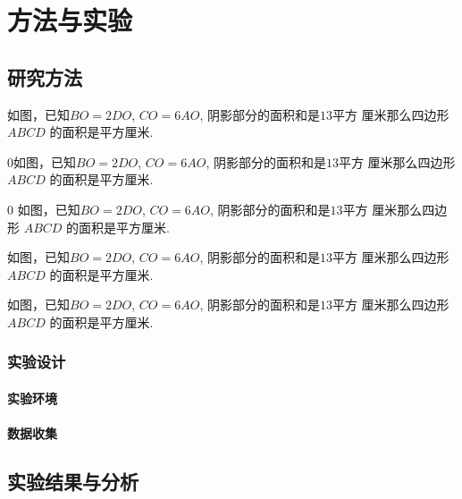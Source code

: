 \documentclass{USTBBook}
\begin{document}
\part{方法与实验}
\ToggleSectionStyle
\ToggleQuestionStyle

\chapter{研究方法}

\begin{question}
  如图，已知$BO=2DO$, $CO=6AO$, 阴影部分的面积和是$13$平方
  厘米那么四边形 $ABCD$ 的面积是\fillin[]平方厘米.
\end{question}

\begin{question}
   $0$如图，已知$BO=2DO$, $CO=6AO$, 阴影部分的面积和是$13$平方
  厘米那么四边形 $ABCD$ 的面积是\fillin[]平方厘米.
\end{question}

\begin{question}
  $0$ 如图，已知$BO=2DO$, $CO=6AO$, 阴影部分的面积和是$13$平方
  厘米那么四边形 $ABCD$ 的面积是\fillin[]平方厘米.
\end{question}

\begin{solution}
  如图，已知$BO=2DO$, $CO=6AO$, 阴影部分的面积和是$13$平方
  厘米那么四边形 $ABCD$ 的面积是\fillin[]平方厘米.
\end{solution}

\begin{question}
  如图，已知$BO=2DO$, $CO=6AO$, 阴影部分的面积和是$13$平方
  厘米那么四边形 $ABCD$ 的面积是\fillin[]平方厘米.
\end{question}

\section{实验设计}
\zhlipsum[11]

\subsection{实验环境}
\zhlipsum[12]

\subsection{数据收集}
\zhlipsum[13]

\chapter{实验结果与分析}
\zhlipsum[14]
\end{document}
